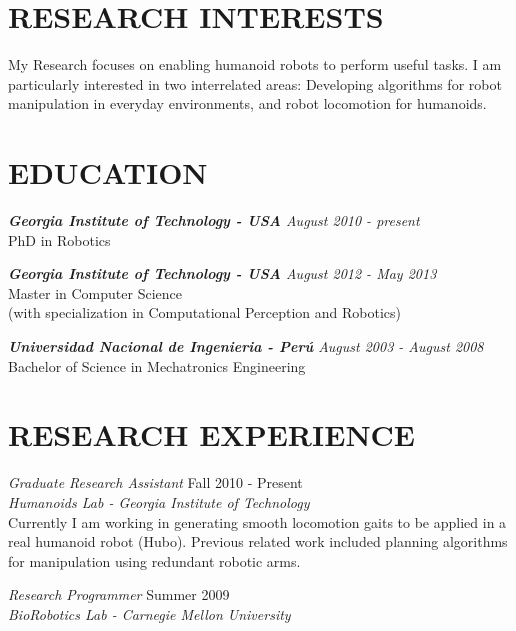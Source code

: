 \documentclass[margin]{res}
\begin{document}
\begin{resume}
 
\section{RESEARCH INTERESTS} My Research focuses on enabling humanoid robots to perform useful tasks.
I am particularly interested in two interrelated areas: Developing algorithms for robot manipulation in everyday environments, and robot locomotion for humanoids.

\section{EDUCATION} 

				{\sl \textbf{Georgia Institute of Technology - USA} \hfill August 2010 - present} \\
                PhD in Robotics 
                       
				{\sl \textbf{Georgia Institute of Technology - USA} \hfill August 2012 - May 2013} \\
                Master in Computer Science \\
                (with specialization in Computational Perception and Robotics) 
                
				{\sl \textbf{Universidad Nacional de Ingenieria - Per\'{u}} \hfill August 2003 - August 2008} \\
                Bachelor of Science in Mechatronics Engineering  \\
     
\section{RESEARCH EXPERIENCE} 

                {\sl Graduate Research Assistant} \hfill            Fall 2010 - Present \\
                {\sl Humanoids Lab - Georgia Institute of Technology}\\ 
				Currently I am working in generating smooth locomotion gaits to be applied in a real humanoid robot (Hubo). Previous related work included planning algorithms for manipulation using redundant robotic arms.

                {\sl Research Programmer} \hfill            Summer 2009 \\
                {\sl BioRobotics Lab - Carnegie Mellon University}


\end{resume}
\end{document}
